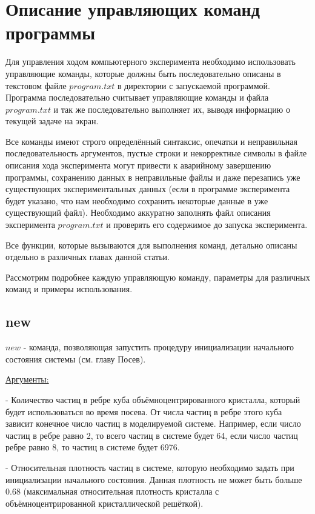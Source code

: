 \documentclass[a4paper]{article}
\begin{document}
\newpage
\section{Описание управляющих команд программы}
Для управления ходом компьютерного эксперимента необходимо использовать управляющие команды, которые должны быть последовательно описаны в текстовом файле $ program.txt $ в директории с запускаемой программой. Программа последовательно считывает управляющие команды и файла $ program.txt $ и так же последовательно выполняет их, выводя информацию о текущей задаче на экран.

Все команды имеют строго определённый синтаксис, опечатки и неправильная последовательность аргументов, пустые строки и некорректные символы в файле описания хода эксперимента могут привести к аварийному завершению программы, сохранению данных в неправильные файлы и даже перезапись уже существующих экспериментальных данных (если в программе эксперимента будет указано, что нам необходимо сохранить некоторые данные в уже существующий файл). Необходимо аккуратно заполнять файл описания эксперимента $ program.txt $ и проверять его содержимое до запуска эксперимента.

Все функции, которые вызываются для выполнения команд, детально описаны отдельно в различных главах данной статьи.

Рассмотрим подробнее каждую управляющую команду, параметры для различных команд и примеры использования.

\subsection{new}
$ new $ - команда, позволяющая запустить процедуру инициализации начального состояния системы (см. главу Посев). 

\uline{Аргументы:}

- Количество частиц в ребре куба объёмноцентрированного кристалла, который будет использоваться во время посева. От числа частиц в ребре этого куба зависит конечное число частиц в моделируемой системе. Например, если число частиц в ребре равно 2, то всего частиц в системе будет 64, если число частиц ребре равно 8, то частиц в системе будет 6976.

- Относительная плотность частиц в системе, которую необходимо задать при инициализации начального состояния. Данная плотность не может быть больше 0.68 (максимальная относительная плотность кристалла с объёмноцентрированной кристаллической решёткой).
\end{document}
